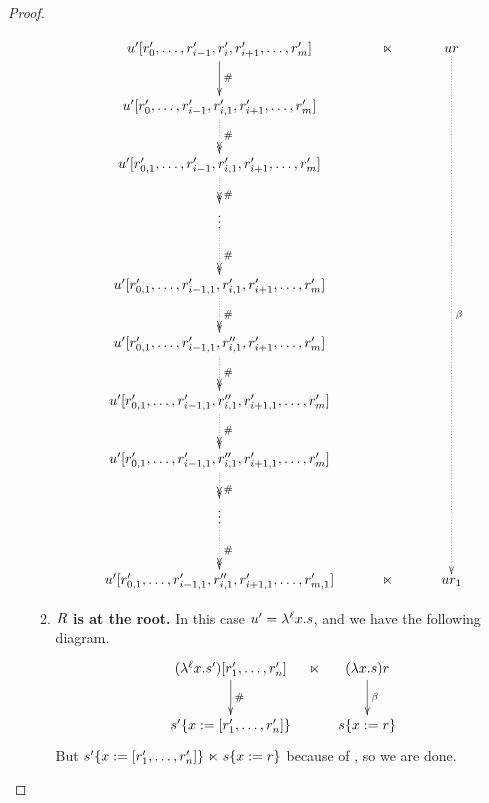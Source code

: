\begin{proof}
\begin{enumerate}
\begin{enumerate}
    \[
    \xymatrix@C=1cm{
    \tmthree' [\tmfour'_0, \hdots, \tmfour'_{i-1}, \tmfour'_i, \tmfour'_{i+1}, \hdots, \tmfour'_m]
      \ar[d]^{\dist} & \refines & \tmthree \tmfour \ar@{.>}[ddddddddd]^{\beta} \\
    \tmthree' [\tmfour'_0, \hdots, \tmfour'_{i-1}, \tmfour'_{i,1}, \tmfour'_{i+1}, \hdots, \tmfour'_m] \ar@{.>>}[d]^{\dist} & & \\
    \tmthree' [\tmfour'_{0, 1}, \hdots, \tmfour'_{i-1}, \tmfour'_{i,1}, \tmfour'_{i+1}, \hdots, \tmfour'_m] \ar@{.>>}[d]^{\dist} & & \\
    \vdots \ar@{.>>}[d]^{\dist} & & \\
    \tmthree' [\tmfour'_{0, 1}, \hdots, \tmfour'_{i-1,1}, \tmfour'_{i,1}, \tmfour'_{i+1}, \hdots, \tmfour'_m] \ar@{.>>}[d]^{\dist} & & \\
    \tmthree' [\tmfour'_{0, 1}, \hdots, \tmfour'_{i-1,1}, \tmfour''_{i,1}, \tmfour'_{i+1}, \hdots, \tmfour'_m] \ar@{.>>}[d]^{\dist} & & \\
    \tmthree' [\tmfour'_{0, 1}, \hdots, \tmfour'_{i-1,1}, \tmfour''_{i,1}, \tmfour'_{i+1,1}, \hdots, \tmfour'_m] \ar@{.>>}[d]^{\dist} & & \\
    \tmthree' [\tmfour'_{0, 1}, \hdots, \tmfour'_{i-1,1}, \tmfour''_{i,1}, \tmfour'_{i+1,1}, \hdots, \tmfour'_m] \ar@{.>>}[d]^{\dist} & & \\
    \vdots \ar@{.>>}[d]^{\dist} & & \\
    \tmthree' [\tmfour'_{0, 1}, \hdots, \tmfour'_{i-1,1}, \tmfour''_{i,1}, \tmfour'_{i+1,1}, \hdots, \tmfour'_{m,1}] & \refines  & \tmthree \tmfour_1                    \\
    }
    \]
  \item {\bf $R$ is at the root.} In this case $u' = \lambda^{\ell} x. s$, and
    we have the following diagram.
  \[
  \xymatrix@C=.25cm{
  (\lamp{\lab}{\var}{\tmtwo'}) [\tmfour'_1, \hdots, \tmfour'_n] \ar[d]^{\dist} & \refines & (\lam{\var}{\tmtwo}) \tmfour
  \ar@{->}[d]^{\beta}\\
  \subs{\tmtwo'}{\var}{[\tmfour'_1, \hdots, \tmfour'_n]} &  & \subs{\tmtwo}{\var}{\tmfour} \\
  }
  \]
  But $s'\{x := [r'_1, \hdots, r'_n]\} \mathrel{\ltimes} s\{x := r\}$
  because of , so we are done.
  \end{enumerate}
\end{enumerate}
\end{proof}
